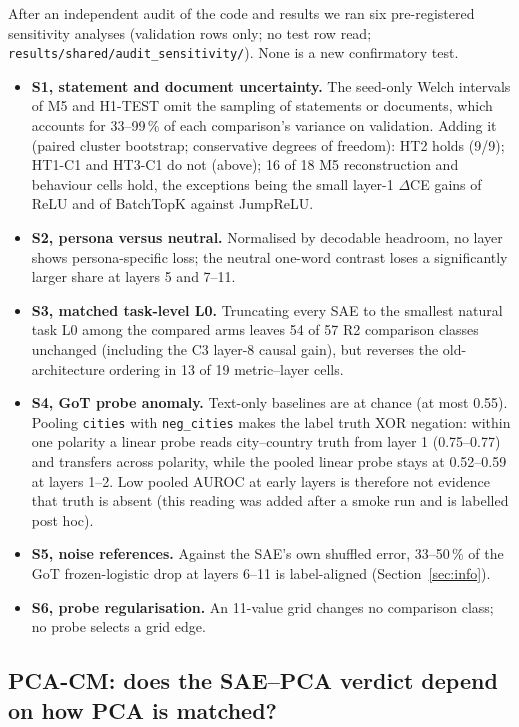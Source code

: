 After an independent audit of the code and results we ran six pre-registered sensitivity analyses (validation rows
only; no test row read; \texttt{results/\allowbreak{}shared/\allowbreak{}audit\_sensitivity/}). None is a new confirmatory
test.
\begin{itemize}
\item \textbf{S1, statement and document uncertainty.} The seed-only Welch intervals of M5 and H1-TEST omit the
  sampling of statements or documents, which accounts for 33--99\,\% of each comparison's variance on validation.
  Adding it (paired cluster bootstrap; conservative degrees of freedom): HT2 holds (9/9); HT1-C1 and HT3-C1 do not
  (above); 16 of 18 M5 reconstruction and behaviour cells hold, the exceptions being the small layer-1 $\Delta$CE gains
  of ReLU and of BatchTopK against JumpReLU.
\item \textbf{S2, persona versus neutral.} Normalised by decodable headroom, no layer shows persona-specific loss; the
  neutral one-word contrast loses a significantly larger share at layers 5 and 7--11.
\item \textbf{S3, matched task-level L0.} Truncating every SAE to the smallest natural task L0 among the compared arms
  leaves 54 of 57 R2 comparison classes unchanged (including the C3 layer-8 causal gain), but reverses the
  old-architecture ordering in 13 of 19 metric--layer cells.
\item \textbf{S4, GoT probe anomaly.} Text-only baselines are at chance (at most 0.55). Pooling \texttt{cities} with
  \texttt{neg\_cities} makes the label truth XOR negation: within one polarity a linear probe reads city--country
  truth from layer 1 (0.75--0.77) and transfers across polarity, while the pooled linear probe stays at 0.52--0.59 at
  layers 1--2. Low pooled AUROC at early layers is therefore not evidence that truth is absent (this reading was added
  after a smoke run and is labelled post hoc).
\item \textbf{S5, noise references.} Against the SAE's own shuffled error, 33--50\,\% of the GoT frozen-logistic drop at
  layers 6--11 is label-aligned (Section~\ref{sec:info}).
\item \textbf{S6, probe regularisation.} An 11-value grid changes no comparison class; no probe selects a grid edge.
\end{itemize}

\subsection{PCA-CM: does the SAE--PCA verdict depend on how PCA is matched?}\label{sec:pcacm}

